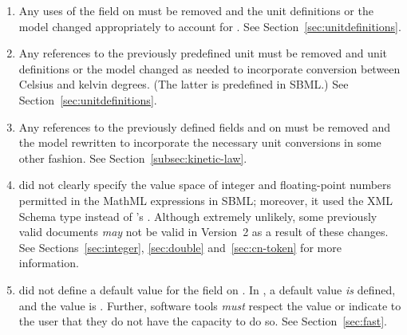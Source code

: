 \begin{enumerate}
  
\item Any uses of the field  on \UnitDefinition must
  be removed and the unit definitions or the model changed
  appropriately to account for .
  See Section~\ref{sec:unitdefinitions}.
  
\item Any references to the previously predefined unit
   must be removed and unit definitions or the model
  changed as needed to incorporate conversion between Celsius
  and kelvin degrees.  (The latter is predefined in SBML.)  See
  Section~\ref{sec:unitdefinitions}.
  
\item Any references to the previously defined fields
   and  on \KineticLaw
  must be removed and the model rewritten to incorporate the
  necessary unit conversions in some other fashion.  See
  Section~\ref{subsec:kinetic-law}.
  

\item \sbmltwoone did not clearly specify the value space of
  integer and floating-point numbers permitted in the MathML
  expressions in SBML; moreover, it used the XML Schema type
   instead of \sbmltwotwo's .  Although
  extremely unlikely, some previously valid \sbmltwoone documents
  \emph{may} not be valid in Version~2 as a result of these
  changes.  See Sections~\ref{sec:integer}, \ref{sec:double}
  and~\ref{sec:cn-token} for more information.

\item \sbmltwoone did not define a default value for the field
   on \Reaction.  In \sbmltwotwo, a default value
  \emph{is} defined, and the value is .  Further,
  software tools \emph{must} respect the value or indicate to the
  user that they do not have the capacity to do so.  See
  Section~\ref{sec:fast}.
  

\end{enumerate}
